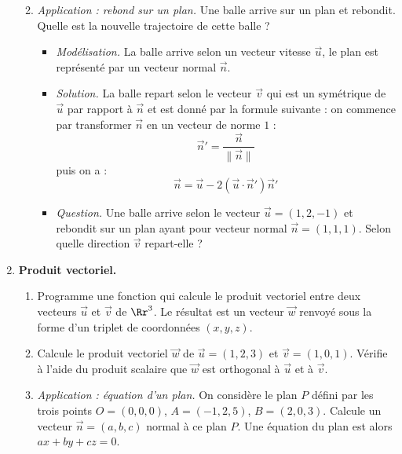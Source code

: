 \documentclass[11pt,class=report,crop=false]{standalone}
\begin{document}
\begin{activite}[Vecteurs]
\begin{enumerate}
\begin{enumerate}
\begin{itemize}
		\end{itemize}		
			
		\item \emph{Application : rebond sur un plan.}
		Une balle arrive sur un plan et rebondit. Quelle est la nouvelle trajectoire de cette balle ?
		
		\begin{itemize}
			\item \emph{Modélisation.} La balle arrive selon un vecteur vitesse $\vec u$, le plan est représenté par un vecteur normal $\vec n$.
			
			\item \emph{Solution.} La balle repart selon le vecteur $\vec v$ qui est un symétrique de $\vec u$ par rapport à $\vec n$ et est donné par la formule suivante :
			on commence par transformer $\vec n$ en un vecteur de norme $1$ :
			$$\vec n' = \frac{\vec n}{\|\vec n\|}$$
			puis on a :
			$$ \vec n = \vec u - 2 (\vec u \cdot \vec n') \vec n'$$
			
			
			\item \emph{Question.} Une balle arrive selon le vecteur $\vec u = (1,2,-1)$ et rebondit sur un plan ayant pour vecteur normal $\vec n = (1,1,1)$. Selon quelle direction $\vec v$ repart-elle ?				
		\end{itemize}	
		 
	\end{enumerate} 
	
	\item \textbf{Produit vectoriel.}
	
	\begin{enumerate}
		\item Programme une fonction  qui calcule le produit vectoriel entre deux vecteurs $\vec u$ et $\vec v$ de $\Rr^3$. Le résultat est un vecteur $\vec w$ renvoyé sous la forme d'un triplet de coordonnées $(x,y,z)$.
		
		\item Calcule le produit vectoriel $\vec w$ de $\vec u = (1,2,3)$ et $\vec v = (1,0,1)$. Vérifie à l'aide du produit scalaire que $\vec w$ est orthogonal à $\vec u$ et à $\vec v$.
		
		\item \emph{Application : équation d'un plan.} On considère le plan $P$ défini par les trois points $O=(0,0,0)$, $A=(-1,2,5)$, $B = (2,0,3)$. Calcule un vecteur $\vec n = (a,b,c)$ normal à ce plan $P$. Une équation du plan est alors $ax+by+cz=0$.
		

\end{enumerate}
\end{enumerate}
\end{activite}
\end{document}
